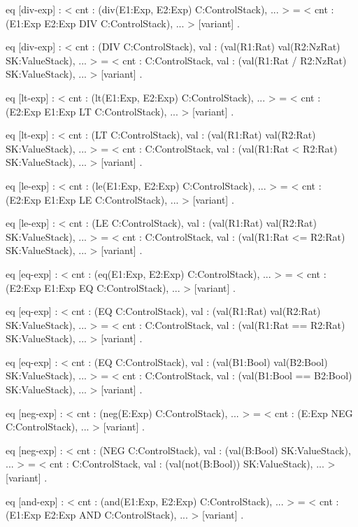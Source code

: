 \documentclass{llncs}%
\begin{document}
    eq [div-exp] :
        < cnt : (div(E1:Exp, E2:Exp) C:ControlStack), ... > 
     =
        < cnt : (E1:Exp E2:Exp DIV C:ControlStack), ... > [variant] .

    eq [div-exp] :
        < cnt : (DIV C:ControlStack),
          val : (val(R1:Rat) val(R2:NzRat) SK:ValueStack), ... > 
     =
        < cnt : C:ControlStack,
          val : (val(R1:Rat / R2:NzRat) SK:ValueStack), ... > [variant] .

    eq [lt-exp] :
        < cnt : (lt(E1:Exp, E2:Exp) C:ControlStack), ... > 
     =
        < cnt : (E2:Exp E1:Exp LT C:ControlStack), ... > [variant] .

    eq [lt-exp] :
        < cnt : (LT C:ControlStack),
          val : (val(R1:Rat) val(R2:Rat) SK:ValueStack), ... > 
     =
        < cnt : C:ControlStack,
          val : (val(R1:Rat < R2:Rat) SK:ValueStack), ... > [variant] .

    eq [le-exp] :
        < cnt : (le(E1:Exp, E2:Exp) C:ControlStack), ... > 
     =
        < cnt : (E2:Exp E1:Exp LE C:ControlStack), ... > [variant] .

    eq [le-exp] :
        < cnt : (LE C:ControlStack),
          val : (val(R1:Rat) val(R2:Rat) SK:ValueStack), ... > 
     =
        < cnt : C:ControlStack,
          val : (val(R1:Rat <= R2:Rat) SK:ValueStack), ... > [variant] .

    eq [eq-exp] :
        < cnt : (eq(E1:Exp, E2:Exp) C:ControlStack), ... > 
     =
        < cnt : (E2:Exp E1:Exp EQ C:ControlStack), ... > [variant] .

    eq [eq-exp] :
        < cnt : (EQ C:ControlStack),
          val : (val(R1:Rat) val(R2:Rat) SK:ValueStack), ... > 
     =
        < cnt : C:ControlStack,
          val : (val(R1:Rat == R2:Rat) SK:ValueStack), ... > [variant] .

    eq [eq-exp] :
        < cnt : (EQ C:ControlStack),
          val : (val(B1:Bool) val(B2:Bool) SK:ValueStack), ... > 
     =
        < cnt : C:ControlStack,
          val : (val(B1:Bool == B2:Bool) SK:ValueStack), ... > [variant] .

    eq [neg-exp] :
        < cnt : (neg(E:Exp) C:ControlStack), ... > 
     =
        < cnt : (E:Exp NEG C:ControlStack), ... > [variant] .

    eq [neg-exp] :
        < cnt : (NEG C:ControlStack),
          val : (val(B:Bool) SK:ValueStack), ... > 
     =
        < cnt : C:ControlStack,
          val : (val(not(B:Bool)) SK:ValueStack), ... > [variant] .

    eq [and-exp] :
        < cnt : (and(E1:Exp, E2:Exp) C:ControlStack), ... > 
     =
        < cnt : (E1:Exp E2:Exp AND C:ControlStack), ... > [variant] .
\end{document}
